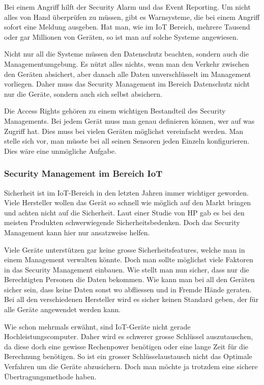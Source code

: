 Bei einem Angriff hilft der Security Alarm und das Event Reporting. Um nicht alles von Hand überprüfen zu müssen, gibt es Warnsysteme, die bei einem Angriff sofort eine Meldung ausgeben. Hat man, wie im IoT Bereich, mehrere Tausend oder gar Millionen von Geräten, so ist man auf solche Systeme angewiesen.

Nicht nur all die Systeme müssen den Datenschutz beachten, sondern auch die Managementumgebung. Es nützt alles nichts, wenn man den Verkehr zwischen den Geräten absichert, aber danach alle Daten unverschlüsselt im Management vorliegen. Daher muss das Security Management im Bereich Datenschutz nicht nur die Geräte, sondern auch sich selbst absichern.

Die Access Rights gehören zu einem wichtigen Bestandteil des Security Managements. Bei jedem Gerät muss man genau definieren können, wer auf was Zugriff hat. Dies muss bei vielen Geräten möglichst vereinfacht werden. Man stelle sich vor, man müsste bei all seinen Sensoren jeden Einzeln konfigurieren. Dies wäre eine unmögliche Aufgabe.
\subsubsection{Security Management im Bereich IoT}
Sicherheit ist im IoT-Bereich in den letzten Jahren immer wichtiger geworden. Viele Hersteller wollen das Gerät so schnell wie möglich auf den Markt bringen und achten nicht auf die Sicherheit. Laut einer Studie von HP gab es bei den meisten Produkten schwerwiegende Sicherheitsbedenken.\cite{SecOverview} Doch das Security Management kann hier nur ansatzweise helfen.

Viele Geräte unterstützen gar keine grosse Sicherheitsfeatures, welche man in einem Management verwalten könnte. Doch man sollte möglichst viele Faktoren in das Security Management einbauen. Wie stellt man nun sicher, dass nur die Berechtigten Personen die Daten bekommen. Wie kann man bei all den Geräten sicher sein, dass keine Daten sonst wo abfliessen und in Fremde Hände geraten. Bei all den verschiedenen Hersteller wird es sicher keinen Standard geben, der für alle Geräte angewendet werden kann.

Wie schon mehrmals erwähnt, sind IoT-Geräte nicht gerade Hochleistungscomputer. Daher wird es schwerer grosse Schlüssel auszutauschen, da diese doch eine gewisse Rechenpower benötigen oder eine lange Zeit für die Berechnung benötigen. So ist ein grosser Schlüsselaustausch nicht das Optimale Verfahren um die Geräte abzusichern. Doch man möchte ja trotzdem eine sichere Übertragungsmethode haben.

